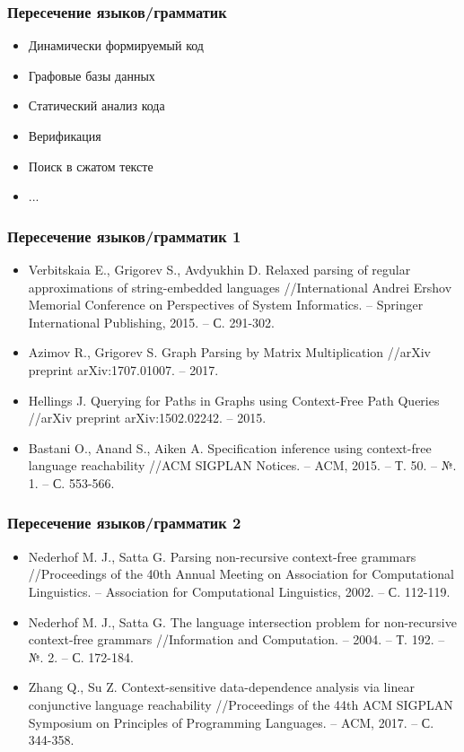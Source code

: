 \documentclass{beamer}
\begin{document}
\begin{frame}[fragile]
\transwipe[direction=90]
\frametitle{Пересечение языков/грамматик}
  \begin{itemize}
    \item Динамически формируемый код
    \item Графовые базы данных   
    \item Статический анализ кода
    \item Верификация
    \item Поиск в сжатом тексте
    \item ...
  \end{itemize}
\end{frame}

\begin{frame}[fragile]
\transwipe[direction=90]
\frametitle{Пересечение языков/грамматик 1}
  \begin{itemize}
    \item Verbitskaia E., Grigorev S., Avdyukhin D. Relaxed parsing of regular approximations of string-embedded languages //International Andrei Ershov Memorial Conference on Perspectives of System Informatics. – Springer International Publishing, 2015. – С. 291-302.
    \item Azimov R., Grigorev S. Graph Parsing by Matrix Multiplication //arXiv preprint arXiv:1707.01007. – 2017.
    \item Hellings J. Querying for Paths in Graphs using Context-Free Path Queries //arXiv preprint arXiv:1502.02242. – 2015.
    \item Bastani O., Anand S., Aiken A. Specification inference using context-free language reachability //ACM SIGPLAN Notices. – ACM, 2015. – Т. 50. – №. 1. – С. 553-566.
  \end{itemize}
\end{frame}

\begin{frame}[fragile]
\transwipe[direction=90]
\frametitle{Пересечение языков/грамматик 2}
  \begin{itemize}
    \item Nederhof M. J., Satta G. Parsing non-recursive context-free grammars //Proceedings of the 40th Annual Meeting on Association for Computational Linguistics. – Association for Computational Linguistics, 2002. – С. 112-119.
    \item Nederhof M. J., Satta G. The language intersection problem for non-recursive context-free grammars //Information and Computation. – 2004. – Т. 192. – №. 2. – С. 172-184.
    \item Zhang Q., Su Z. Context-sensitive data-dependence analysis via linear conjunctive language reachability //Proceedings of the 44th ACM SIGPLAN Symposium on Principles of Programming Languages. – ACM, 2017. – С. 344-358.
  \end{itemize}
\end{frame}
\end{document}
